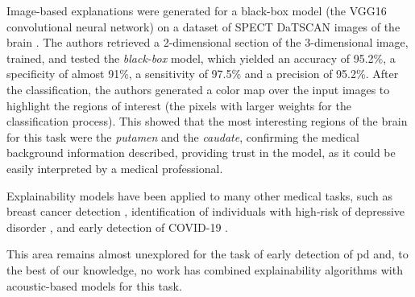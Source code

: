 Image-based explanations were generated for a black-box model (the VGG16 convolutional neural network) on a dataset of SPECT DaTSCAN images of the brain \cite{LIME_explainability}. The authors retrieved a 2-dimensional section of the 3-dimensional image, trained, and tested the \textit{black-box} model, which yielded an accuracy of 95.2\%, a specificity of almost 91\%, a sensitivity of 97.5\% and a precision of 95.2\%. After the classification, the authors generated a color map over the input images to highlight the regions of interest (the pixels with larger weights for the classification process). This showed that the most interesting regions of the brain for this task were the \textit{putamen} and the \textit{caudate}, confirming the medical background information described, providing trust in the model, as it could be easily interpreted by a medical professional.

Explainability models have been applied to many other medical tasks, such as breast cancer detection \cite{lime_breast_cancer}, identification of individuals with high-risk of depressive disorder \cite{lime_depression}, and early detection of COVID-19 \cite{lime_covid}. 

This area remains almost unexplored for the task of early detection of \gls{pd} and, to the best of our knowledge, no work has combined explainability algorithms with acoustic-based models for this task.



